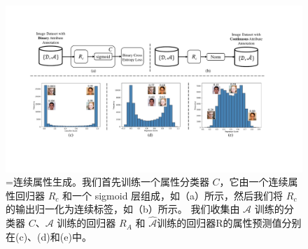 \begin{figure}[!t]
  \centering
  \includegraphics[width=1.0\linewidth]{figures/ACGAN/continue.pdf}
  \caption{=连续属性生成。我们首先训练一个属性分类器 $C$，它由一个连续属性回归器 $R_c$ 和一个 sigmoid 层组成，如（a）所示，然后我们将 $R_c$ 的输出归一化为连续标签，如（b）所示。 我们收集由 $\mathcal{A}$ 训练的分类器 $C$、$\mathcal{A}$ 训练的回归器 $R_A$ 和 $\hat{\mathcal{A}} 训练的回归器 $R$ 的属性预测值 $分别在(c)、(d)和(e)中。}
  \label{fig:quantization}
\end{figure}

